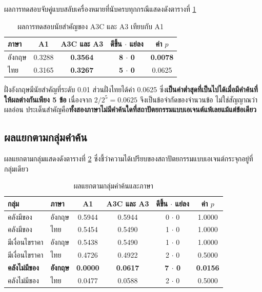 ผลการทดสอบจับคู่แบบสลับเครื่องหมายที่นับครบทุกกรณีแสดงดังตารางที่ \ref{tab:signif}

\begin{table}[H]
\centering
\caption{ผลการทดสอบนัยสำคัญของ A3C และ A3 เทียบกับ A1}
\label{tab:signif}
\begin{tabular}{|l|c|c|c|c|}
\hline
\textbf{ภาษา} & \textbf{A1} & \textbf{A3C และ A3} & \textbf{ดีขึ้น $\cdot$ แย่ลง} & \textbf{ค่า $p$} \\
\hline
อังกฤษ & 0.3288 & \textbf{0.3564} & \textbf{8 $\cdot$ 0} & \textbf{0.0078} \\ \hline
ไทย & 0.3165 & \textbf{0.3267} & \textbf{5 $\cdot$ 0} & 0.0625 \\
\hline
\end{tabular}
\end{table}

ฝั่งอังกฤษมีนัยสำคัญที่ระดับ 0.01 ส่วนฝั่งไทยได้ค่า 0.0625 ซึ่ง\textbf{เป็นค่าต่ำสุดที่เป็นไปได้เมื่อมีคำค้นที่ให้ผลต่างกันเพียง 5 ข้อ} เนื่องจาก $2/2^5 = 0.0625$ จึงเป็นข้อจำกัดของจำนวนข้อ ไม่ใช่สัญญาณว่าผลอ่อน ประเด็นสำคัญคือ\textbf{ทั้งสองภาษาไม่มีคำค้นใดที่สถาปัตยกรรมแบบเอเจนต์แพ้เลยแม้แต่ข้อเดียว}

\subsection{ผลแยกตามกลุ่มคำค้น}

ผลแยกตามกลุ่มแสดงดังตารางที่ \ref{tab:bygroup} ซึ่งชี้ว่าความได้เปรียบของสถาปัตยกรรมแบบเอเจนต์กระจุกอยู่ที่กลุ่มเดียว

\begin{table}[H]
\centering
\caption{ผลแยกตามกลุ่มคำค้นและภาษา}
\label{tab:bygroup}
\begin{tabular}{|l|l|c|c|c|c|}
\hline
\textbf{กลุ่ม} & \textbf{ภาษา} & \textbf{A1} & \textbf{A3C และ A3} & \textbf{ดีขึ้น $\cdot$ แย่ลง} & \textbf{ค่า $p$} \\
\hline
คลังมีของ & อังกฤษ & 0.5944 & 0.5944 & 0 $\cdot$ 0 & 1.0000 \\ \hline
คลังมีของ & ไทย & 0.5454 & 0.5490 & 1 $\cdot$ 0 & 1.0000 \\ \hline
มีเงื่อนไขราคา & อังกฤษ & 0.5438 & 0.5490 & 1 $\cdot$ 0 & 1.0000 \\ \hline
มีเงื่อนไขราคา & ไทย & 0.4726 & 0.4922 & 2 $\cdot$ 0 & 0.5000 \\ \hline
\textbf{คลังไม่มีของ} & \textbf{อังกฤษ} & \textbf{0.0000} & \textbf{0.0617} & \textbf{7 $\cdot$ 0} & \textbf{0.0156} \\ \hline
คลังไม่มีของ & ไทย & 0.0477 & 0.0588 & 2 $\cdot$ 0 & 0.5000 \\
\hline
\end{tabular}
\end{table}

